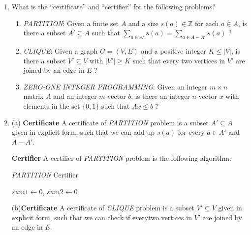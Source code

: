 \documentclass[12pt,a4paper]{article}
\makeatletter
\newtheorem*{solution}{Solution}
\theoremstyle{definition}
\renewenvironment{solution}[1][Solution] {\par\pushQED{\qed}\normalfont\topsep6\p@\@plus6\p@\relax\trivlist\item[\hskip\labelsep\bfseries#1\@addpunct{.}]\ignorespaces}{\popQED\endtrivlist\@endpefalse} \makeatother
\makeatother
\begin{document}
\begin{enumerate}
    \item
    What is the ``certificate'' and ``certifier'' for the following problems?
    \begin{enumerate}
        \item
        \emph{PARTITION}: Given a finite set $A$ and a size $s(a) \in \mathbb{Z}$ for each $a \in A$, is there a subset $A' \subseteq A$ such that $\sum_{a \in A'}s(a) = \sum_{a \in A-A'}s(a)$ ?

        \item
        \emph{CLIQUE}: Given a graph $G = (V, E)$ and a positive integer $K \leq |V|$, is there a subset $V' \subseteq V$ with $|V'| \geq K$ such that every two vertices in $V'$ are joined by an edge in $E$ ?

        \item
        \emph{ZERO-ONE INTEGER PROGRAMMING}: Given an integer $m \times n$ matrix $A$ and an integer $m$-vector $b$, is there an integer $n$-vector $x$ with elements in the set $\{0, 1\}$ such that $Ax \leq b$ ?
    \end{enumerate}
    \begin{solution}
        (a) \textbf{Certificate} \;A certificate of \emph{PARTITION} problem is a subset $A'\subseteq A$ given in explicit form, such that we can add up $s(a)$ for every $a\in A'$ and $A-A'$.

        \textbf{Certifier} \;A certifier of \emph{PARTITION} problem is the following algorithm:\newline
        \begin{minipage}[t]{0.9\textwidth}
            \begin{algorithm}[H]
              \BlankLine
              \caption{\emph{PARTITION} Certifier}
              \BlankLine
              $sum1\leftarrow0$, $sum2\leftarrow0$\;
             {}{}
            \end{algorithm}
            \end{minipage}
        
            (b)\textbf{Certificate} \;A certificate of \emph{CLIQUE} problem is a subset $V'\subseteq V$ given in explicit form, such that we can check if everytwo vertices in $V'$ are joined by an edge in $E$.


\end{solution}
\end{enumerate}
\end{document}
